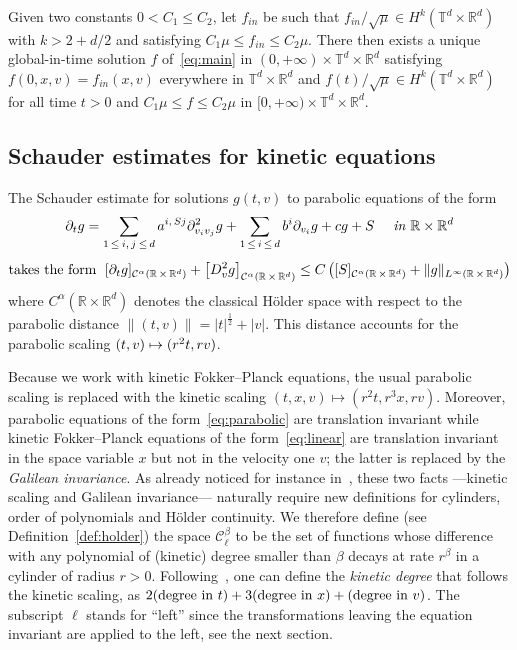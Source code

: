 \documentclass[AHL,Unicode,longabstracts,published]{cedram}
\newcommand{\R}{\mathbb{R}}
\newcommand{\T}{\mathbb{T}}
\newcommand{\cC}{\mathcal{C}}
\begin{document}
\begin{theo}\label{theo:main-holder}
Given two constants $0<C_1\le C_2$, let $f_{in}$ be such that $f_{in}/\sqrt{\mu} \in H^k(\T^d \times \R^{d})$ with $k > 2+d/2$ and satisfying $ C_1 \mu \le f_{in} \le C_2 \mu$. There then exists a unique global-in-time solution $f$ of~\eqref{eq:main} in $(0,+\infty) \times \T^d \times \R^d$ satisfying $f(0,x,v) = f_{in} (x,v)$ everywhere in $\T^d \times \R^{d}$ and $f(t)/\sqrt{\mu} \in H^k(\T^d \times \R^{d})$ for all time $t>0$ and $C_1 \mu \le f \le C_2 \mu$ in $[0,+\infty) \times \T^d \times \R^d$.
\end{theo}


\subsection{Schauder estimates for kinetic equations}

The Schauder estimate for solutions $g(t,v)$ to parabolic equations of the form
\begin{multline}\label{eq:parabolic}
\partial_t g =
\sum_{1\,\le\:i,\,j\:\le\,d} a^{i,\,Sj} \partial^2_{v_iv_j} g +
\sum_{1\,\le\,i\,\le\,d}b^i \partial_{v_i} g + c g + S \quad \emph{ in } \R \times \R^d \\[1ex]
\text{takes the form } \; [\partial_t g]_{\cC^{\alpha}\left(\R\,\times\,\R^d\right)} + \left[D^2_v g\right]_{\cC^\alpha\left(\R\,\times\,\R^d\right)} \le C
\left([S]_{\cC^\alpha\left(\R\,\times\,\R^d\right)} + \|g\|_{L^\infty\left(\R\,\times\,\R^d\right)} \right)
\end{multline}
where $C^\alpha (\R \times \R^d)$ denotes the classical H\"older space with respect to the parabolic distance $\|(t,v)\|=|t|^{\frac12} + |v|$. This distance accounts for the parabolic scaling $(t,v)\linebreak\mapsto (r^2t,rv)$.

Because we work with kinetic Fokker--Planck equations, the usual parabolic scaling is replaced with the kinetic scaling $(t,x,v) \mapsto (r^2t,r^3x,rv)$. Moreover, parabolic equations of the form~\eqref{eq:parabolic} are translation invariant while kinetic Fokker--Planck equations of the form~\eqref{eq:linear} are translation invariant in the space variable $x$ but not in the velocity one $v$; the latter is replaced by the \emph{Galilean invariance}. As already noticed for instance in~\cite{gimv,polidoro1994}, these two facts ---kinetic scaling and Galilean invariance--- naturally require new definitions for cylinders, order of polynomials and H\"older continuity. We therefore define (see Definition~\ref{def:holder}) the space $\cC^\beta_\ell$ to be the set of functions whose difference with any polynomial of (kinetic) degree smaller than $\beta$ decays at rate $r^\beta$ in a cylinder of radius $r>0$. Following~\cite{imbert2018schauder}, one can define the \emph{kinetic degree} that follows the kinetic scaling, as $2 (\text{degree in } t) + 3(\text{degree in } x)\linebreak+ (\text{degree in } v)$. The subscript $\ell$ stands for ``left'' since the transformations leaving the equation invariant are applied to the left, see the next section.
\end{document}
